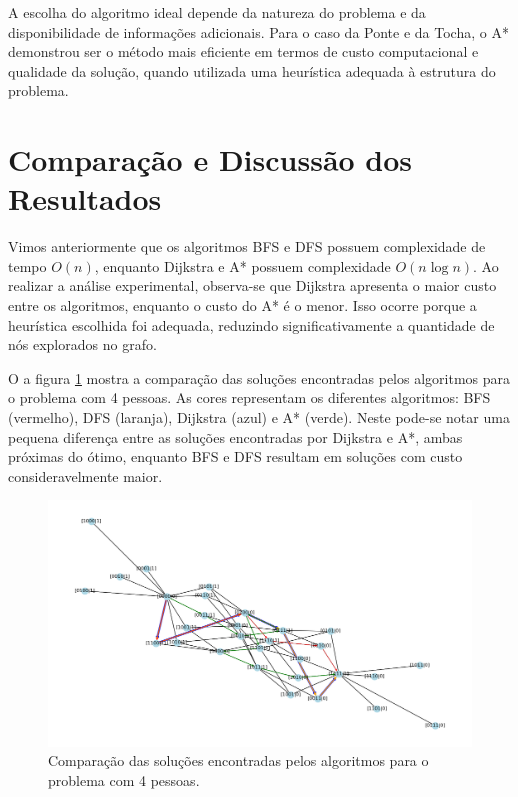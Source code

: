 \documentclass[12pt,a4paper]{article}
\begin{document}
A escolha do algoritmo ideal depende da natureza do problema e da disponibilidade de informações adicionais. 
Para o caso da Ponte e da Tocha, o A* demonstrou ser o método mais eficiente em termos de custo computacional e qualidade da solução, quando utilizada uma heurística adequada à estrutura do problema.

\section{Comparação e Discussão dos Resultados}

Vimos anteriormente que os algoritmos BFS e DFS possuem complexidade de tempo $O(n)$, enquanto Dijkstra e A* possuem complexidade $O(n \log n)$. Ao realizar a análise experimental, observa-se que Dijkstra apresenta o maior custo entre os algoritmos, enquanto o custo do A* é o menor. Isso ocorre porque a heurística escolhida foi adequada, reduzindo significativamente a quantidade de nós explorados no grafo.

O a figura \ref{fig:fig_graph_comparsion} mostra a comparação das soluções encontradas pelos algoritmos para o problema com 4 pessoas. As cores representam os diferentes algoritmos: BFS (vermelho), DFS (laranja), Dijkstra (azul) e A* (verde). Neste pode-se notar uma pequena diferença entre as soluções encontradas por Dijkstra e A*, ambas próximas do ótimo, enquanto BFS e DFS resultam em soluções com custo consideravelmente maior.

\begin{figure}[H]
    \centering
    \includegraphics[width=0.8\linewidth]{graph_comparsion_complete_labels.png}
    \caption{Comparação das soluções encontradas pelos algoritmos para o problema com 4 pessoas.}
    \label{fig:fig_graph_comparsion}
    \hspace{\fill}
\end{figure}
\end{document}
